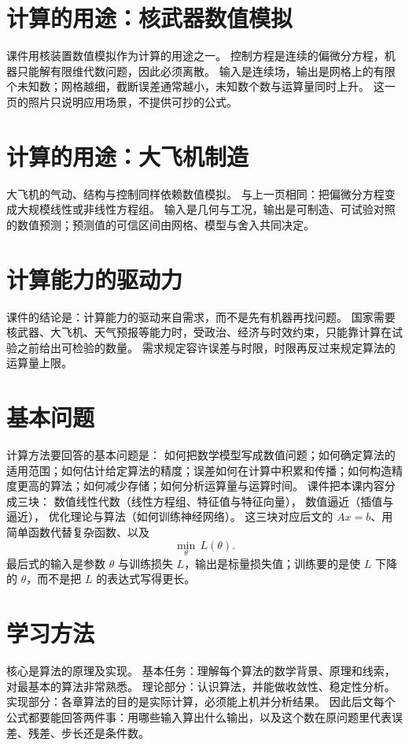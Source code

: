 \section{计算的用途：核武器数值模拟}

课件用核装置数值模拟作为计算的用途之一。
控制方程是连续的偏微分方程，机器只能解有限维代数问题，因此必须离散。
输入是连续场，输出是网格上的有限个未知数；网格越细，截断误差通常越小，未知数个数与运算量同时上升。
这一页的照片只说明应用场景，不提供可抄的公式。

\section{计算的用途：大飞机制造}

大飞机的气动、结构与控制同样依赖数值模拟。
与上一页相同：把偏微分方程变成大规模线性或非线性方程组。
输入是几何与工况，输出是可制造、可试验对照的数值预测；预测值的可信区间由网格、模型与舍入共同决定。

\section{计算能力的驱动力}

课件的结论是：计算能力的驱动来自需求，而不是先有机器再找问题。
国家需要核武器、大飞机、天气预报等能力时，受政治、经济与时效约束，只能靠计算在试验之前给出可检验的数量。
需求规定容许误差与时限，时限再反过来规定算法的运算量上限。

\section{基本问题}

计算方法要回答的基本问题是：
如何把数学模型写成数值问题；如何确定算法的适用范围；如何估计给定算法的精度；误差如何在计算中积累和传播；如何构造精度更高的算法；如何减少存储；如何分析运算量与运算时间。
课件把本课内容分成三块：
数值线性代数（线性方程组、特征值与特征向量），
数值逼近（插值与逼近），
优化理论与算法（如何训练神经网络）。
这三块对应后文的 $Ax=b$、用简单函数代替复杂函数、以及
\[
\min_{\theta}\,L(\theta).
\]
最后式的输入是参数 $\theta$ 与训练损失 $L$，输出是标量损失值；训练要的是使 $L$ 下降的 $\theta$，而不是把 $L$ 的表达式写得更长。

\section{学习方法}

核心是算法的原理及实现。
基本任务：理解每个算法的数学背景、原理和线索，对最基本的算法非常熟悉。
理论部分：认识算法，并能做收敛性、稳定性分析。
实现部分：各章算法的目的是实际计算，必须能上机并分析结果。
因此后文每个公式都要能回答两件事：用哪些输入算出什么输出，以及这个数在原问题里代表误差、残差、步长还是条件数。

